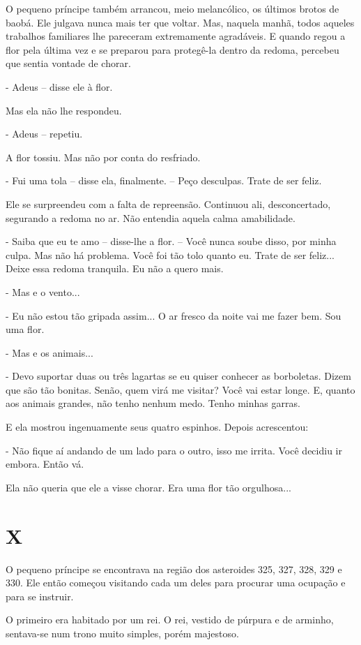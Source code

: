 O pequeno príncipe também arrancou, meio melancólico, os últimos brotos
de baobá. Ele julgava nunca mais ter que voltar. Mas, naquela manhã,
todos aqueles trabalhos familiares lhe pareceram extremamente
agradáveis. E quando regou a flor pela última vez e se preparou para
protegê-la dentro da redoma, percebeu que sentia vontade de chorar.

- Adeus -- disse ele à flor.

Mas ela não lhe respondeu.

- Adeus -- repetiu.

A flor tossiu. Mas não por conta do resfriado.

- Fui uma tola -- disse ela, finalmente. -- Peço desculpas. Trate de ser
feliz.

Ele se surpreendeu com a falta de repreensão. Continuou ali,
desconcertado, segurando a redoma no ar. Não entendia aquela calma
amabilidade.

- Saiba que eu te amo -- disse-lhe a flor. -- Você nunca soube disso,
por minha culpa. Mas não há problema. Você foi tão tolo quanto eu. Trate
de ser feliz... Deixe essa redoma tranquila. Eu não a quero mais.

- Mas e o vento...

- Eu não estou tão gripada assim... O ar fresco da noite vai me fazer
bem. Sou uma flor.

- Mas e os animais...

- Devo suportar duas ou três lagartas se eu quiser conhecer as
borboletas. Dizem que são tão bonitas. Senão, quem virá me visitar? Você
vai estar longe. E, quanto aos animais grandes, não tenho nenhum medo.
Tenho minhas garras.

E ela mostrou ingenuamente seus quatro espinhos. Depois acrescentou:

- Não fique aí andando de um lado para o outro, isso me irrita. Você
decidiu ir embora. Então vá.

Ela não queria que ele a visse chorar. Era uma flor tão orgulhosa...

\chapter{X}

O pequeno príncipe se encontrava na região dos asteroides 325, 327, 328,
329 e 330. Ele então começou visitando cada um deles para procurar uma
ocupação e para se instruir.

O primeiro era habitado por um rei. O rei, vestido de púrpura e de
arminho, sentava-se num trono muito simples, porém majestoso.

